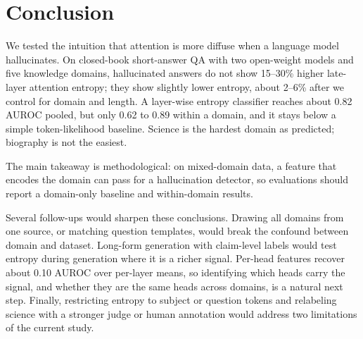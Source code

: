 \section{Conclusion}
\label{sec:conclusion}

We tested the intuition that attention is more diffuse when a language model hallucinates.
On closed-book short-answer QA with two open-weight models and five knowledge domains, hallucinated answers do not show 15--30\% higher late-layer attention entropy; they show slightly lower entropy, about 2--6\% after we control for domain and length.
A layer-wise entropy classifier reaches about 0.82 AUROC pooled, but only 0.62 to 0.89 within a domain, and it stays below a simple token-likelihood baseline.
Science is the hardest domain as predicted; biography is not the easiest.

The main takeaway is methodological: on mixed-domain data, a feature that encodes the domain can pass for a hallucination detector, so evaluations should report a domain-only baseline and within-domain results.

Several follow-ups would sharpen these conclusions.
Drawing all domains from one source, or matching question templates, would break the confound between domain and dataset.
Long-form generation with claim-level labels would test entropy during generation where it is a richer signal.
Per-head features recover about 0.10 AUROC over per-layer means, so identifying which heads carry the signal, and whether they are the same heads across domains, is a natural next step.
Finally, restricting entropy to subject or question tokens and relabeling science with a stronger judge or human annotation would address two limitations of the current study.
